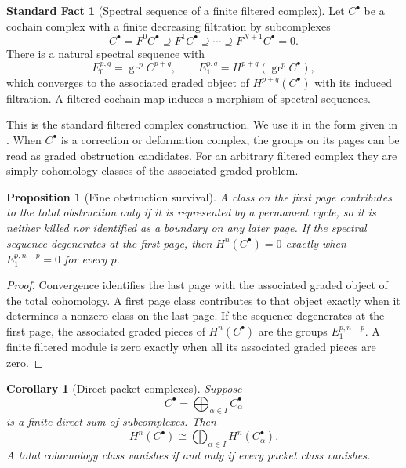 \documentclass[11pt,a4paper]{article}
\theoremstyle{plain}
\newtheorem{proposition}[proposition]{Proposition}
\newtheorem{corollary}[corollary]{Corollary}
\theoremstyle{definition}
\newtheorem{standardfact}[standardfact]{Standard Fact}
\theoremstyle{remark}
\newcommand{\gr}{\operatorname{gr}}
\begin{document}
\begin{standardfact}[Spectral sequence of a finite filtered complex]\label{fact:filtered_spectral_sequence}
Let $C^\bullet$ be a cochain complex with a finite decreasing filtration by subcomplexes
\[
C^\bullet=F^0C^\bullet\supseteq F^1C^\bullet\supseteq\cdots\supseteq F^{N+1}C^\bullet=0.
\]
There is a natural spectral sequence with
\[
E_0^{p,q}=\gr^pC^{p+q},
\qquad
E_1^{p,q}=H^{p+q}(\gr^pC^\bullet),
\]
which converges to the associated graded object of $H^{p+q}(C^\bullet)$ with its induced filtration.  A filtered cochain map induces a morphism of spectral sequences.
\end{standardfact}

This is the standard filtered complex construction.  We use it in the form given in \cite{Weibel1994,McCleary2001}.  When $C^\bullet$ is a correction or deformation complex, the groups on its pages can be read as graded obstruction candidates.  For an arbitrary filtered complex they are simply cohomology classes of the associated graded problem.

\begin{proposition}[Fine obstruction survival]\label{prop:fine_obstruction_survival}
A class on the first page contributes to the total obstruction only if it is represented by a permanent cycle, so it is neither killed nor identified as a boundary on any later page.  If the spectral sequence degenerates at the first page, then $H^n(C^\bullet)=0$ exactly when $E_1^{p,n-p}=0$ for every $p$.
\end{proposition}

\begin{proof}
Convergence identifies the last page with the associated graded object of the total cohomology.  A first page class contributes to that object exactly when it determines a nonzero class on the last page.  If the sequence degenerates at the first page, the associated graded pieces of $H^n(C^\bullet)$ are the groups $E_1^{p,n-p}$.  A finite filtered module is zero exactly when all its associated graded pieces are zero.
\end{proof}

\begin{corollary}[Direct packet complexes]\label{cor:direct_packet_no_cancellation}
Suppose
\[
C^\bullet=\bigoplus_{\alpha\in I}C_\alpha^\bullet
\]
is a finite direct sum of subcomplexes.  Then
\[
H^n(C^\bullet)
\cong
\bigoplus_{\alpha\in I}H^n(C_\alpha^\bullet).
\]
A total cohomology class vanishes if and only if every packet class vanishes.
\end{corollary}
\end{document}
